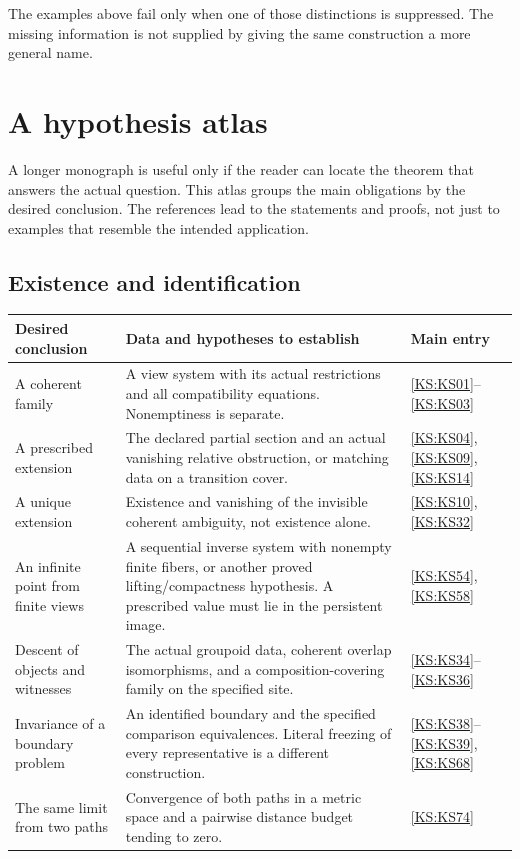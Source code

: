\documentclass[11pt,oneside,openany]{book}
\newcommand{\chap}[1]{\section{#1}}
\numberwithin{equation}{section}
\begin{document}
The examples above fail only when one of those distinctions is suppressed. The missing information is not supplied by giving the same construction a more general name.





\chap{A hypothesis atlas}\label{KS:app:hypotheses}
A longer monograph is useful only if the reader can locate the theorem that answers the actual question. This atlas groups the main obligations by the desired conclusion. The references lead to the statements and proofs, not just to examples that resemble the intended application.

\subsection{Existence and identification}
\begin{longtable}{@{}p{.24\linewidth}p{.48\linewidth}p{.21\linewidth}@{}}
\toprule Desired conclusion & Data and hypotheses to establish & Main entry\\\midrule\endhead
A coherent family & A view system with its actual restrictions and all compatibility equations. Nonemptiness is separate. & \ref{KS:KS01}--\ref{KS:KS03}\\[4pt]
A prescribed extension & The declared partial section and an actual vanishing relative obstruction, or matching data on a transition cover. & \ref{KS:KS04}, \ref{KS:KS09}, \ref{KS:KS14}\\[4pt]
A unique extension & Existence and vanishing of the invisible coherent ambiguity, not existence alone. & \ref{KS:KS10}, \ref{KS:KS32}\\[4pt]
An infinite point from finite views & A sequential inverse system with nonempty finite fibers, or another proved lifting/compactness hypothesis. A prescribed value must lie in the persistent image. & \ref{KS:KS54}, \ref{KS:KS58}\\[4pt]
Descent of objects and witnesses & The actual groupoid data, coherent overlap isomorphisms, and a composition-covering family on the specified site. & \ref{KS:KS34}--\ref{KS:KS36}\\[4pt]
Invariance of a boundary problem & An identified boundary and the specified comparison equivalences. Literal freezing of every representative is a different construction. & \ref{KS:KS38}--\ref{KS:KS39}, \ref{KS:KS68}\\[4pt]
The same limit from two paths & Convergence of both paths in a metric space and a pairwise distance budget tending to zero. & \ref{KS:KS74}\\
\bottomrule
\end{longtable}
\end{document}
